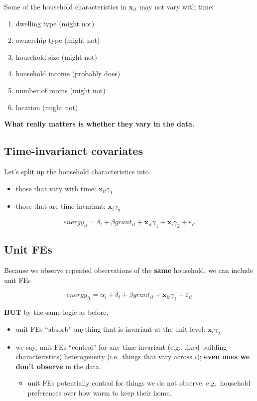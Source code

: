 \documentclass[
  letterpaper,
  DIV=11,
  numbers=noendperiod]{scrartcl}
\providecommand{\tightlist}{%
  \setlength{\itemsep}{0pt}\setlength{\parskip}{0pt}}
\begin{document}
Some of the household characteristics in \(\mathbf{x}_{it}\) may not
vary with time:

\begin{enumerate}
\def\labelenumi{\arabic{enumi}.}
\item
  dwelling type (might not)
\item
  ownership type (might not)
\item
  household size (might not)
\item
  household income (probably does)
\item
  number of rooms (might not)
\item
  location (might not)
\end{enumerate}

\textbf{What really matters is whether they vary in the data.}

\subsection{Time-invarianct
covariates}\label{time-invarianct-covariates}

Let's split up the household characteristics into

\begin{itemize}
\item
  those that vary with time: \(\mathbf{x}_{it}\gamma_1\)
\item
  those that are time-invariant: \(\mathbf{x}_{i}\gamma_2\)
\end{itemize}

\[
  energy_{it} = \delta_t + \beta grant_{it} + \mathbf{x}_{it}\gamma_1 + \mathbf{x}_{i}\gamma_2 + \varepsilon_{it}
\]

\subsection{Unit FEs}\label{unit-fes}

Because we observe repeated observations of the \textbf{same} household,
we can include unit FEs

\[
  energy_{it} = \alpha_i + \delta_t + \beta grant_{it} + \mathbf{x}_{it}\gamma_1 + \varepsilon_{it}
\]

\textbf{BUT} by the same logic as before,

\begin{itemize}
\item
  unit FEs ``absorb'' anything that is invariant at the unit level:
  \(\mathbf{x}_{i}\gamma_2\)
\item
  we say, unit FEs ``control'' for any time-invariant (e.g., fixed
  building characteristics) heterogeneity (i.e.~things that vary across
  \(i\)); \textbf{even ones we don't observe} in the data.

  \begin{itemize}
  \tightlist
  \item
    unit FEs potentially control for things we do not observe:
    e.g.~household preferences over how warm to keep their home.
  \end{itemize}
\end{itemize}
\end{document}
